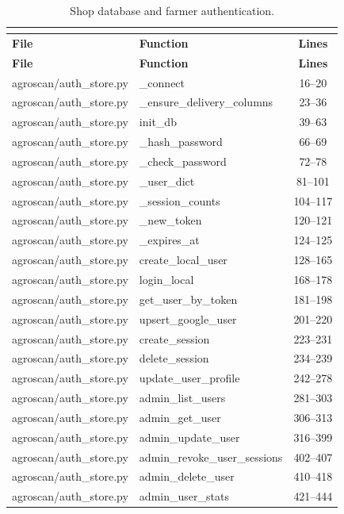 \begin{center}
\footnotesize
\begin{longtable}{@{}p{4.6cm}p{5.2cm}c@{}}
\caption{Shop database and farmer authentication.}\\
\label{tab:pyshop}\\
\toprule
\textbf{File} & \textbf{Function} & \textbf{Lines} \\
\midrule
\endfirsthead
\toprule
\textbf{File} & \textbf{Function} & \textbf{Lines} \\
\midrule
\endhead
agroscan/auth\_store.py & \_connect & 16--20 \\
agroscan/auth\_store.py & \_ensure\_delivery\_columns & 23--36 \\
agroscan/auth\_store.py & init\_db & 39--63 \\
agroscan/auth\_store.py & \_hash\_password & 66--69 \\
agroscan/auth\_store.py & \_check\_password & 72--78 \\
agroscan/auth\_store.py & \_user\_dict & 81--101 \\
agroscan/auth\_store.py & \_session\_counts & 104--117 \\
agroscan/auth\_store.py & \_new\_token & 120--121 \\
agroscan/auth\_store.py & \_expires\_at & 124--125 \\
agroscan/auth\_store.py & create\_local\_user & 128--165 \\
agroscan/auth\_store.py & login\_local & 168--178 \\
agroscan/auth\_store.py & get\_user\_by\_token & 181--198 \\
agroscan/auth\_store.py & upsert\_google\_user & 201--220 \\
agroscan/auth\_store.py & create\_session & 223--231 \\
agroscan/auth\_store.py & delete\_session & 234--239 \\
agroscan/auth\_store.py & update\_user\_profile & 242--278 \\
agroscan/auth\_store.py & admin\_list\_users & 281--303 \\
agroscan/auth\_store.py & admin\_get\_user & 306--313 \\
agroscan/auth\_store.py & admin\_update\_user & 316--399 \\
agroscan/auth\_store.py & admin\_revoke\_user\_sessions & 402--407 \\
agroscan/auth\_store.py & admin\_delete\_user & 410--418 \\
agroscan/auth\_store.py & admin\_user\_stats & 421--444 \\

\end{longtable}
\end{center}

